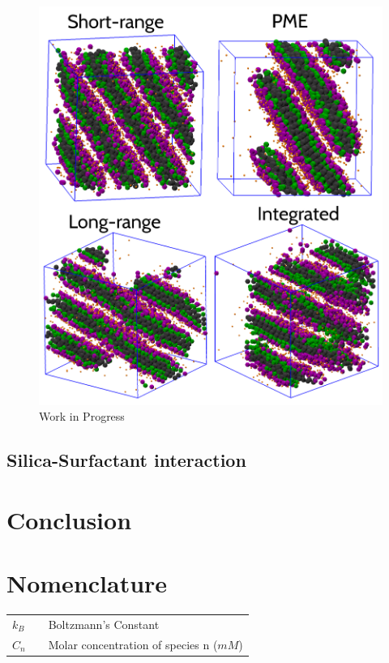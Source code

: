 \documentclass[10pt,a4paper,twoside]{article}
\begin{document}
\begin{figure}[H]
  \begin{center}
	\includegraphics[width=1 \textwidth]{./images/boxes1000}
	\caption{Work in Progress}
	\label{Fig:b1000}
  \end{center}
\end{figure}
 
\subsection{Silica-Surfactant interaction}

\section{Conclusion} 
\section{Nomenclature} 
   \begin{tabulary}{1.0\textwidth}{LCL}
   $k_B$ & & Boltzmann's Constant\\
   $C_n$ &   & Molar concentration of species n ($mM$) \\
   \end{tabulary}
\end{document}
